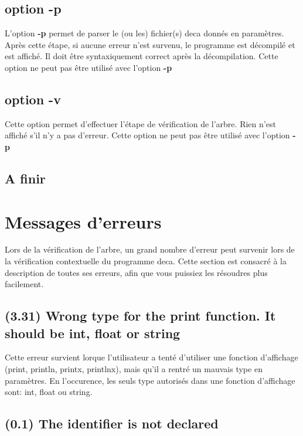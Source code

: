 \documentclass[12pt, a4paper, one side]{article}
\begin{document}
\subsection{option -p}

L'option \textbf{-p} permet de parser le (ou les) fichier(s) deca donnés en paramètres.
Après cette étape, si aucune erreur n'est survenu, le programme est décompilé et est
affiché. Il doit être syntaxiquement correct après la décompilation. Cette option ne peut
pas être utilisé avec l'option \textbf{-p}

\subsection{option -v}

Cette option permet d'effectuer l'étape de vérification de l'arbre. Rien n'est affiché s'il
n'y a pas d'erreur. Cette option ne peut pas être utilisé avec l'option \textbf{-p}

\subsection{A finir }

\section{Messages d'erreurs}

Lors de la vérification de l'arbre, un grand nombre d'erreur peut survenir lors de la vérification
contextuelle du programme deca. Cette section est consacré à la description de toutes ses erreurs,
afin que vous puissiez les résoudres plus facilement.

\subsection{(3.31) Wrong type for the print function. It should be int, float or string}

Cette erreur survient lorque l'utilisateur a tenté d'utiliser une fonction d'affichage (print, println, printx, printlnx),
mais qu'il a rentré un mauvais type en paramètres. En l'occurence, les seuls type autorisés dans une
fonction d'affichage sont: int, float ou string.

\subsection{(0.1) The identifier is not declared}
\end{document}
